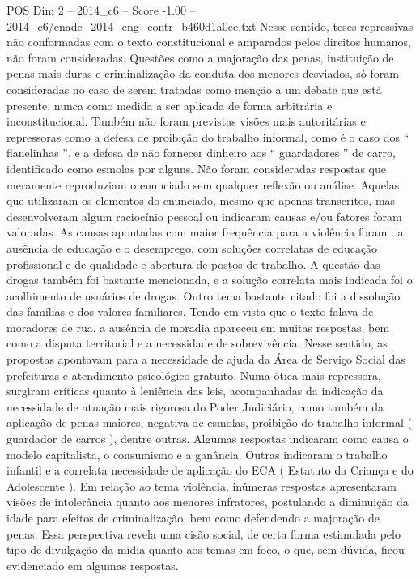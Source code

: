 \begin{textsample}{POS Dim 2 – 2014\_c6 – Score -1.00 – 2014\_c6/enade\_2014\_eng\_contr\_b460d1a0ee.txt}
Nesse sentido, teses repressivas não conformadas com o texto constitucional e amparados pelos direitos humanos, não foram consideradas.
Questões como a majoração das penas, instituição de penas mais duras e criminalização da conduta dos menores desviados, só foram consideradas no caso de serem tratadas como menção a um debate que está presente, nunca como medida a ser aplicada de forma arbitrária e inconstitucional.
Também não foram previstas visões mais autoritárias e repressoras como a defesa de proibição do trabalho informal, como é o caso dos “ flanelinhas ”, e a defesa de não fornecer dinheiro aos “ guardadores ” de carro, identificado como esmolas por alguns.
Não foram consideradas respostas que meramente reproduziam o enunciado sem qualquer reflexão ou análise.
Aquelas que utilizaram os elementos do enunciado, mesmo que apenas transcritos, mas desenvolveram algum raciocínio pessoal ou indicaram causas e/ou fatores foram valoradas.
As causas apontadas com maior frequência para a violência foram : a ausência de educação e o desemprego, com soluções correlatas de educação profissional e de qualidade e abertura de postos de trabalho.
A questão das drogas também foi bastante mencionada, e a solução correlata mais indicada foi o acolhimento de usuários de drogas.
Outro tema bastante citado foi a dissolução das famílias e dos valores familiares.
Tendo em vista que o texto falava de moradores de rua, a ausência de moradia apareceu em muitas respostas, bem como a disputa territorial e a necessidade de sobrevivência.
Nesse sentido, as propostas apontavam para a necessidade de ajuda da Área de Serviço Social das prefeituras e atendimento psicológico gratuito.
Numa ótica mais repressora, surgiram críticas quanto à leniência das leis, acompanhadas da indicação da necessidade de atuação mais rigorosa do Poder Judiciário, como também da aplicação de penas maiores, negativa de esmolas, proibição do trabalho informal ( guardador de carros ), dentre outras.
Algumas respostas indicaram como causa o modelo capitalista, o consumismo e a ganância.
Outras indicaram o trabalho infantil e a correlata necessidade de aplicação do ECA ( Estatuto da Criança e do Adolescente ).
Em relação ao tema violência, inúmeras respostas apresentaram visões de intolerância quanto aos menores infratores, postulando a diminuição da idade para efeitos de criminalização, bem como defendendo a majoração de penas.
Essa perspectiva revela uma cisão social, de certa forma estimulada pelo tipo de divulgação da mídia quanto aos temas em foco, o que, sem dúvida, ficou evidenciado em algumas respostas.

\end{textsample}
